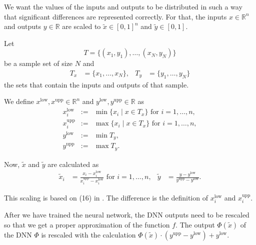 We want the values of the inputs and outputs to be distributed in such a way that significant differences are represented correctly. For that, the inputs $x\in\mathbb{R}^n$ and outputs $y\in\mathbb{R}$ are scaled to $\tilde{x}\in[0,1]^n$ and $\tilde{y}\in[0,1]$.

Let
\begin{equation}
T=\{(x_1,y_1),\dotsc,(x_N,y_N)\}
\end{equation}
be a sample set of size $N$ and
\begin{align*}
T_x&=\{x_1,\dotsc,x_N\},&T_y&=\{y_1,\dotsc,y_N\}
\end{align*}
the sets that contain the inputs and outputs of that sample.

We define $x^\mathrm{low}, x^\mathrm{upp}\in\mathbb{R}^n$ and $y^\mathrm{low}, y^\mathrm{upp}\in\mathbb{R}$ as
\begin{eqnarray}
\label{minIn}
x^\mathrm{low}_i&:=&\operatorname*{min}\{x_i\mid x\in T_x\}\text{ for }i=1,\dotsc,n,\\
\label{maxIn}
x^\mathrm{upp}_i&:=&\operatorname*{max}\{x_i\mid x\in T_x\}\text{ for }i=1,\dotsc,n,\\
\label{minOut}
y^\mathrm{low}&:=&\operatorname*{min}T_y,\\
\label{maxOut}
y^\mathrm{upp}&:=&\operatorname*{max}T_y.
\end{eqnarray}

Now, $\tilde{x}$ and $\tilde{y}$ are calculated as
\begin{align}
\label{scalingToZeroOne}
\tilde{x}_i&=\frac{x_i-x^\mathrm{low}_i}{x^\mathrm{upp}_i-x^\mathrm{low}_i}\text{ for }i=1,\dotsc,n,&\tilde{y}&=\frac{y-y^\mathrm{low}}{y^\mathrm{upp}-y^\mathrm{low}}.
\end{align}

This scaling is based on (16) in \cite{Keil2022-dj}. The difference is the definition of $x^\mathrm{low}_i$ and $x^\mathrm{upp}_i$.

After we have trained the neural network, the DNN outputs need to be rescaled so that we get a proper approximation of the function $f$. The output $\Phi(\tilde{x})$ of the DNN $\Phi$ is rescaled with the calculation $\Phi(\tilde{x})\cdot(y^\mathrm{upp}-y^\mathrm{low})+y^\mathrm{low}$.

